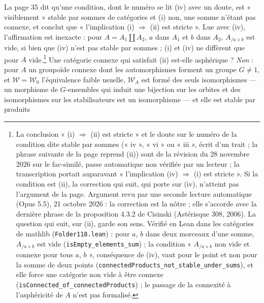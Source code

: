 \documentclass[11pt,a4paper]{article}
\begin{document}
La page 35 dit qu'une condition, dont le numéro se lit (iv) avec un doute, est « visiblement » stable par sommes de catégories et (i) non, une somme n'étant pas connexe, et conclut que « l'implication (i) $\Rightarrow$ (ii) est stricte ». Lue avec (iv), l'affirmation est inexacte : pour $A = A_1 \amalg A_2$, $a$ dans $A_1$ et $b$ dans $A_2$, $A_{/a \times b}$ est vide, si bien que (iv) n'est pas stable par sommes ; (i) et (iv) ne diffèrent que pour $A$ vide.\footnote{La conclusion « (i) $\Rightarrow$ (ii) est stricte » et le doute sur le numéro de la condition dite stable par sommes (« iv », « vi » ou « iii », écrit d'un trait ; la phrase suivante de la page reprend (ii)) sont de la révision du 28 novembre 2026 sur le fac-similé, passe automatique non vérifiée par un lecteur ; la transcription portait auparavant « l'implication (iv) $\Rightarrow$ (i) est stricte ». Si la condition est (ii), la correction qui suit, qui porte sur (iv), n'atteint pas l'argument de la page. Argument revu par une seconde lecture automatique (Opus 5.5), 21 octobre 2026 : la correction est la nôtre ; elle s'accorde avec la dernière phrase de la proposition 4.3.2 de Cisinski (Astérisque 308, 2006). La question qui suit, sur (ii), garde son sens. Vérifié en Lean dans les catégories de mathlib (\texttt{Folder118.lean}) : pour $a$, $b$ dans deux morceaux d'une somme, $A_{/a \times b}$ est vide (\texttt{isEmpty\_elements\_sum}) ; la condition « $A_{/a \times b}$ non vide et connexe pour tous $a$, $b$ », conséquence de (iv), vaut pour le point et non pour la somme de deux points (\texttt{connectedProducts\_not\_stable\_under\_sums}), et elle force une catégorie non vide à être connexe (\texttt{isConnected\_of\_connectedProducts}) ; le passage de la connexité à l'asphéricité de $A$ n'est pas formalisé.} Une catégorie connexe qui satisfait (ii) est-elle asphérique ?
\emph{Non} : pour $A$ un groupoïde connexe dont les automorphismes forment un
groupe $G \neq 1$, et $\mathcal{W} = \mathcal{W}_{0}$ l'équivalence faible
usuelle, $\mathcal{W}_{A}$ est formé des seuls isomorphismes --- un morphisme
de $G$-ensembles qui induit une bijection sur les orbites et des isomorphismes
sur les stabilisateurs est un isomorphisme --- et elle est stable par produits
\end{document}
